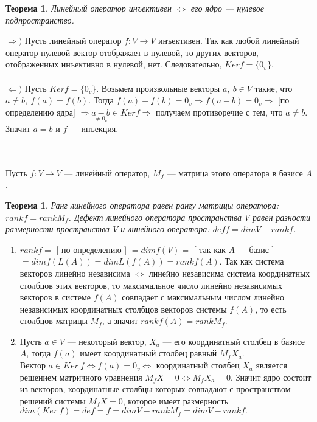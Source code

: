 \newtheorem*{th11_4_1}{Теорема}\begin{th11_4_1}Линейный оператор инъективен $\Longleftrightarrow$ его ядро --- нулевое подпространство.
\end{th11_4_1}\begin{Proof}
	$\Rightarrow)$ Пусть линейный оператор $f:V\rightarrow V$ инъективен. Так как любой линейный оператор нулевой вектор отображает в нулевой, то других векторов, отображенных инъективно в нулевой, нет. Следовательно, $Kerf = \{ 0_v \}$.\\\\
	$\Leftarrow )$ Пусть $Kerf = \{ 0_v \}$. Возьмем произвольные векторы $a,\ b\in V$ такие, что $a\ne b,\ f(a) = f(b).$ Тогда $f(a) - f(b) = 0_v \Rightarrow f(a-b) = 0_v \Rightarrow$ [по определению ядра] $\Rightarrow \underset{\ne 0_v}{a-b} \in Kerf \Rightarrow$ получаем противоречие с тем, что $a\ne b$. Значит $a = b$ и $f$ --- инъекция.
\end{Proof}\\\\
Пусть $f:V\rightarrow V$ --- линейный оператор, $M_f$ --- матрица этого оператора в базисе $A$.
\newtheorem*{th11_4_2}{Теорема}\begin{th11_4_2}Ранг линейного оператора равен рангу матрицы оператора: $rank f = rank M_f$. Дефект линейного оператора пространства $V$ равен разности размерности пространства $V$ и линейного оператора: $def f = dim V - rank f$.
\end{th11_4_2}\begin{Proof}\begin{enumerate}
		\item $rank f=$ [ по определению ] $=dimf(V) =$ [ так как $A$ --- базис ] $= dimf(L(A)) = dim L(f(A)) = rank f(A)$. Так как система векторов линейно независима $\Longleftrightarrow$ линейно независима система координатных столбцов этих векторов, то максимальное число линейно независимых векторов в системе $f(A)$ совпадает с максимальным числом линейно независимых координатных столбцов векторов системы $f(A)$, то есть столбцов матрицы $M_f$, а значит $rank f(A) = rank M_f$.
		\item Пусть $a \in V$ --- некоторый вектор, $X_a$ --- его координатный столбец в базисе $A$, тогда $f(a)$ имеет координатный столбец равный $M_f X_a$. \\Вектор $a\in Ker\ f \Longleftrightarrow f(a) = 0_v \Longleftrightarrow$ координатный столбец $X_a$ является решением матричного уравнения $M_f X = 0 \Longleftrightarrow M_fX_a = 0$. Значит ядро состоит из векторов, координатные столбцы которых совпадают с пространством решений системы $M_f X = 0$, которое имеет размерность $dim(Ker\ f) = def= f = dimV-rankM_f = dimV - rankf.$
	\end{enumerate}
\end{Proof}
